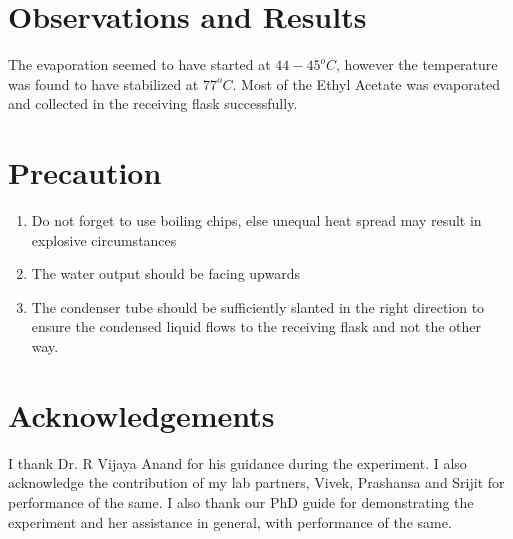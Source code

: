 \section{Observations and Results}
	The evaporation seemed to have started at $44-45 ^o C$, however the temperature was found to have stabilized at $77 ^o C$. Most of the Ethyl Acetate was evaporated and collected in the receiving flask successfully.

\section{Precaution}
	\begin{enumerate}
		\item Do not forget to use boiling chips, else unequal heat spread may result in explosive circumstances
		\item The water output should be facing upwards
		\item The condenser tube should be sufficiently slanted in the right direction to ensure the condensed liquid flows to the receiving flask and not the other way.
	\end{enumerate}

	
\section{Acknowledgements}
I thank Dr. R Vijaya Anand for his guidance during the experiment. I also acknowledge the contribution of my lab partners, Vivek, Prashansa and Srijit for performance of the same. I also thank our PhD guide for demonstrating the experiment and her assistance in general, with performance of the same.


